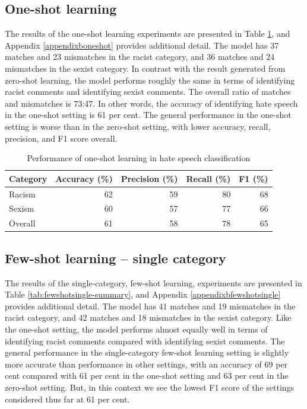 \documentclass[12pt,]{article}
\begin{document}
\hypertarget{one-shot-learning-1}{%
\subsection{One-shot learning}\label{one-shot-learning-1}}

The results of the one-shot learning experiments are presented in Table \ref{tab:oneshot-summary}, and Appendix \ref{appendixboneshot} provides additional detail. The model has 37 matches and 23 mismatches in the racist category, and 36 matches and 24 mismatches in the sexist category. In contrast with the result generated from zero-shot learning, the model performs roughly the same in terms of identifying racist comments and identifying sexist comments. The overall ratio of matches and mismatches is 73:47. In other words, the accuracy of identifying hate speech in the one-shot setting is 61 per cent. The general performance in the one-shot setting is worse than in the zero-shot setting, with lower accuracy, recall, precision, and F1 score overall.

\begin{table}

\caption{\label{tab:oneshot-summary}Performance of one-shot learning in hate speech classification}
\centering
\begin{tabular}[t]{lrrrr}
\toprule
Category & Accuracy (\%) & Precision (\%) & Recall (\%) & F1 (\%)\\
\midrule
Racism & 62 & 59 & 80 & 68\\
Sexism & 60 & 57 & 77 & 66\\
Overall & 61 & 58 & 78 & 65\\
\bottomrule
\end{tabular}
\end{table}

\hypertarget{few-shot-learning-single-category}{%
\subsection{Few-shot learning -- single category}\label{few-shot-learning-single-category}}

The results of the single-category, few-shot learning, experiments are presented in Table \ref{tab:fewshotsingle-summary}, and Appendix \ref{appendixbfewshotsingle} provides additional detail. The model has 41 matches and 19 mismatches in the racist category, and 42 matches and 18 mismatches in the sexist category. Like the one-shot setting, the model performs almost equally well in terms of identifying racist comments compared with identifying sexist comments. The general performance in the single-category few-shot learning setting is slightly more accurate than performance in other settings, with an accuracy of 69 per cent compared with 61 per cent in the one-shot setting and 63 per cent in the zero-shot setting. But, in this context we see the lowest F1 score of the settings considered thus far at 61 per cent.
\end{document}
